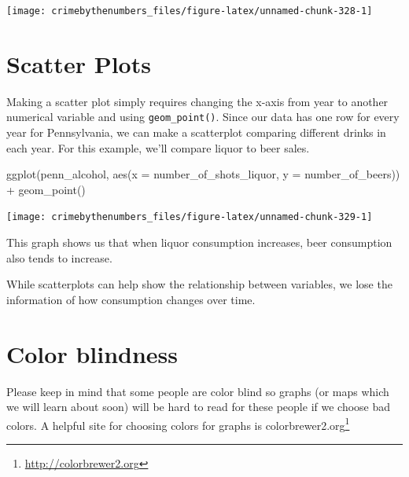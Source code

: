 \documentclass[
]{krantz}
\makeatletter
\newenvironment{Shaded}{\begin{snugshade}}{\end{snugshade}}
\newcommand{\AttributeTok}[1]{\textcolor[rgb]{0.61,0.61,0.61}{#1}}
\newcommand{\FunctionTok}[1]{\textcolor[rgb]{0,0,0}{#1}}
\newcommand{\NormalTok}[1]{#1}
\newcommand{\SpecialCharTok}[1]{\textcolor[rgb]{0,0,0}{#1}}
\renewcommand{\href}[2]{#2\footnote{\url{#1}}}
\newenvironment{kframe}{%
\medskip{}
\setlength{\fboxsep}{.8em}
 \def\at@end@of@kframe{}%
 \ifinner\ifhmode%
  \def\at@end@of@kframe{\end{minipage}}%
  \begin{minipage}{\columnwidth}%
 \fi\fi%
 \def\FrameCommand##1{\hskip\@totalleftmargin \hskip-\fboxsep
 \colorbox{shadecolor}{##1}\hskip-\fboxsep
     \hskip-\linewidth \hskip-\@totalleftmargin \hskip\columnwidth}%
 \MakeFramed {\advance\hsize-\width
   \@totalleftmargin\z@ \linewidth\hsize
   \@setminipage}}%
 {\par\unskip\endMakeFramed%
 \at@end@of@kframe}
\renewenvironment{Shaded}{\begin{kframe}}{\end{kframe}}
\makeatother
\begin{document}
\begin{center}\texttt{[image: crimebythenumbers\_files/figure-latex/unnamed-chunk-328-1]} \end{center}

\hypertarget{scatter-plots}{%
\section{Scatter Plots}\label{scatter-plots}}

Making a scatter plot simply requires changing the x-axis from year to another numerical variable and using \texttt{geom\_point()}. Since our data has one row for every year for Pennsylvania, we can make a scatterplot comparing different drinks in each year. For this example, we'll compare liquor to beer sales.

\begin{Shaded}
\begin{Highlighting}[]
\FunctionTok{ggplot}\NormalTok{(penn\_alcohol, }\FunctionTok{aes}\NormalTok{(}\AttributeTok{x =}\NormalTok{ number\_of\_shots\_liquor,}
                         \AttributeTok{y =}\NormalTok{ number\_of\_beers)) }\SpecialCharTok{+}
  \FunctionTok{geom\_point}\NormalTok{()}
\end{Highlighting}
\end{Shaded}

\begin{center}\texttt{[image: crimebythenumbers\_files/figure-latex/unnamed-chunk-329-1]} \end{center}

This graph shows us that when liquor consumption increases, beer consumption also tends to increase.

While scatterplots can help show the relationship between variables, we lose the information of how consumption changes over time.

\hypertarget{color-blindness}{%
\section{Color blindness}\label{color-blindness}}

Please keep in mind that some people are color blind so graphs (or maps which we will learn about soon) will be hard to read for these people if we choose bad colors. A helpful site for choosing colors for graphs is \href{http://colorbrewer2.org}{colorbrewer2.org}
\end{document}
